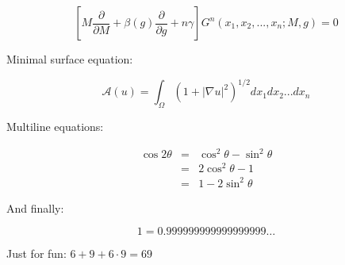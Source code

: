 \documentclass{article}
\begin{document}
\[
\left[M\frac{\partial}{\partial M}+\beta(g)\frac{\partial}{\partial g}+n\gamma\right]G^n(x_1,x_2,...,x_n;M,g)=0
\]

Minimal surface equation:

$$\mathcal{A}(u)=\int_\Omega(1+|\nabla u|^2)^{1/2} dx_1 dx_2 ... dx_n$$ 

Multiline equations:

\begin{eqnarray*}
\cos{2\theta} & = & \cos^2\theta - \sin^2\theta \\
              & = & 2\cos^2\theta - 1 \\
              & = & 1 - 2\sin^2\theta
\end{eqnarray*}

And finally:

$$1=0.999999999999999999\ldots$$

Just for fun: $6 + 9 + 6 \cdot 9 = 69$
\end{document}
